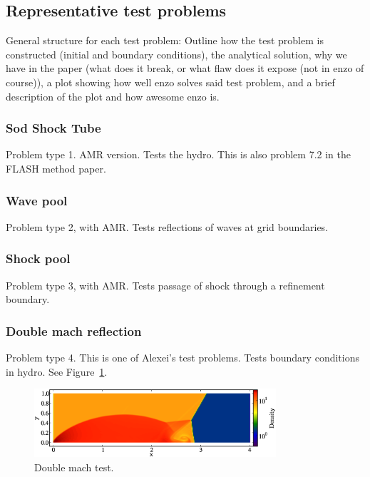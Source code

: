 \subsection{Representative test problems}
\label{sec.tests.problems}

General structure for each test problem:  Outline how the test problem is constructed (initial and boundary conditions), 
the analytical solution, why we have in the paper (what does it break, or what flaw does it expose (not in enzo of course)),
a plot showing how well enzo solves said test problem, and a brief description of the plot and how awesome enzo is.

\subsubsection{Sod Shock Tube}
\label{sec.tests.sodshock}
Problem type 1.  AMR version.  Tests the hydro.
This is also problem 7.2 in the FLASH method paper.

\subsubsection{Wave pool}
\label{sec.tests.wavepool}
Problem type 2, with AMR.  Tests reflections of waves at grid boundaries.

\subsubsection{Shock pool}
\label{sec.tests.shockpool}
Problem type 3, with AMR.  Tests passage of shock through a refinement boundary.

\subsubsection{Double mach reflection}
\label{sec.tests.doublemach}
Problem type 4.  This is one of Alexei's test problems.  Tests
boundary conditions in hydro.  See Figure~\ref{fig.doublemach}.

\begin{figure}
\begin{center}
\includegraphics[width=0.8\textwidth]{figures/DoubleMachTest.eps}
\caption{Double mach test.}
\label{fig.doublemach}
\end{center}
\end{figure}

